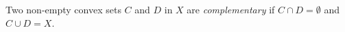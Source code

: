 Two non-empty convex sets $C$ and $D$ in $X$ are \emph{complementary} if $C \cap D = \emptyset$ and $C \cup D = X$.
